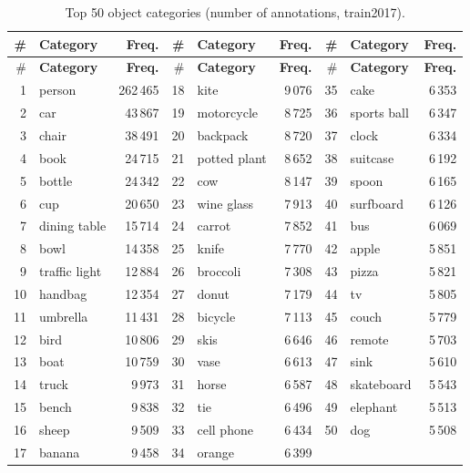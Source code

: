 \documentclass[11pt,a4paper]{article}
\renewcommand{\_}{\textunderscore\allowbreak{}}
\begin{document}
{\small
\begin{longtable}{@{}rlr rlr rlr@{}}
\caption{Top 50 object categories (number of annotations, train2017).}\label{tab:top50}\\
\toprule
\# & \textbf{Category} & \textbf{Freq.} & \# & \textbf{Category} & \textbf{Freq.} & \# & \textbf{Category} & \textbf{Freq.}\\
\midrule
\endfirsthead
\toprule
\# & \textbf{Category} & \textbf{Freq.} & \# & \textbf{Category} & \textbf{Freq.} & \# & \textbf{Category} & \textbf{Freq.}\\
\midrule
\endhead
1 & person & 262\,465 & 18 & kite & 9\,076 & 35 & cake & 6\,353\\
2 & car & 43\,867 & 19 & motorcycle & 8\,725 & 36 & sports ball & 6\,347\\
3 & chair & 38\,491 & 20 & backpack & 8\,720 & 37 & clock & 6\,334\\
4 & book & 24\,715 & 21 & potted plant & 8\,652 & 38 & suitcase & 6\,192\\
5 & bottle & 24\,342 & 22 & cow & 8\,147 & 39 & spoon & 6\,165\\
6 & cup & 20\,650 & 23 & wine glass & 7\,913 & 40 & surfboard & 6\,126\\
7 & dining table & 15\,714 & 24 & carrot & 7\,852 & 41 & bus & 6\,069\\
8 & bowl & 14\,358 & 25 & knife & 7\,770 & 42 & apple & 5\,851\\
9 & traffic light & 12\,884 & 26 & broccoli & 7\,308 & 43 & pizza & 5\,821\\
10 & handbag & 12\,354 & 27 & donut & 7\,179 & 44 & tv & 5\,805\\
11 & umbrella & 11\,431 & 28 & bicycle & 7\,113 & 45 & couch & 5\,779\\
12 & bird & 10\,806 & 29 & skis & 6\,646 & 46 & remote & 5\,703\\
13 & boat & 10\,759 & 30 & vase & 6\,613 & 47 & sink & 5\,610\\
14 & truck & 9\,973 & 31 & horse & 6\,587 & 48 & skateboard & 5\,543\\
15 & bench & 9\,838 & 32 & tie & 6\,496 & 49 & elephant & 5\,513\\
16 & sheep & 9\,509 & 33 & cell phone & 6\,434 & 50 & dog & 5\,508\\
17 & banana & 9\,458 & 34 & orange & 6\,399 & & & \\
\bottomrule
\end{longtable}}
\end{document}
